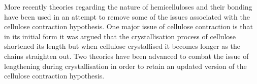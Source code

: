 More recently theories regarding the nature of hemicelluloses and their bonding
have been used in an attempt to remove some of the issues associated with the
cellulose contraction hypothesis. One major issue of cellulose contraction is
that in its initial form it was argued that the crystallisation process of cellulose
shortened its length but when cellulose crystallised it becomes
longer as the chains straighten out. Two theories have been advanced to combat
the issue of lengthening during crystallisation in order to retain an updated
version of the cellulose contraction hypothesis.